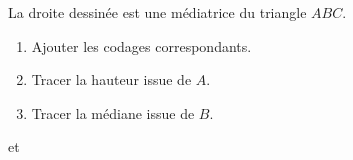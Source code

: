 
\begin{exercice}\label{exosmath-0994}

    La droite dessinée est une médiatrice du triangle \( ABC\). 
    \begin{enumerate}
        \item
            Ajouter les codages correspondants.
        \item
            Tracer la hauteur issue de \( A\).
        \item
            Tracer la médiane issue de \( B\).
    \end{enumerate}

\begin{center}
   
\end{center}
et
\begin{center}
   
\end{center}
    

\end{exercice}
